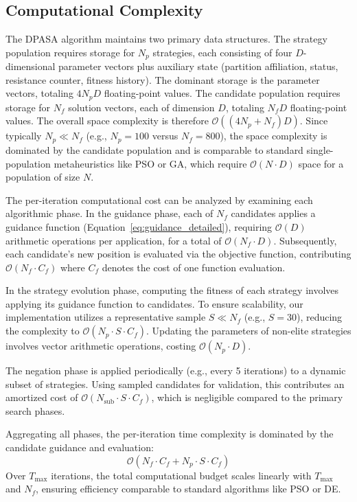 \documentclass[11pt]{article}
\begin{document}
\subsection{Computational Complexity}
\label{sec:method_complexity}

The DPASA algorithm maintains two primary data structures. The strategy population requires storage for $N_p$ strategies, each consisting of four $D$-dimensional parameter vectors plus auxiliary state (partition affiliation, status, resistance counter, fitness history). The dominant storage is the parameter vectors, totaling $4N_p D$ floating-point values. The candidate population requires storage for $N_f$ solution vectors, each of dimension $D$, totaling $N_f D$ floating-point values. The overall space complexity is therefore $\mathcal{O}((4N_p + N_f)D)$. Since typically $N_p \ll N_f$ (e.g., $N_p = 100$ versus $N_f = 800$), the space complexity is dominated by the candidate population and is comparable to standard single-population metaheuristics like PSO or GA, which require $\mathcal{O}(N \cdot D)$ space for a population of size $N$.

The per-iteration computational cost can be analyzed by examining each algorithmic phase. In the guidance phase, each of $N_f$ candidates applies a guidance function (Equation~\ref{eq:guidance_detailed}), requiring $\mathcal{O}(D)$ arithmetic operations per application, for a total of $\mathcal{O}(N_f \cdot D)$. Subsequently, each candidate's new position is evaluated via the objective function, contributing $\mathcal{O}(N_f \cdot C_f)$ where $C_f$ denotes the cost of one function evaluation.

In the strategy evolution phase, computing the fitness of each strategy involves applying its guidance function to candidates. To ensure scalability, our implementation utilizes a representative sample $S \ll N_f$ (e.g., $S=30$), reducing the complexity to $\mathcal{O}(N_p \cdot S \cdot C_f)$. Updating the parameters of non-elite strategies involves vector arithmetic operations, costing $\mathcal{O}(N_p \cdot D)$.

The negation phase is applied periodically (e.g., every 5 iterations) to a dynamic subset of strategies. Using sampled candidates for validation, this contributes an amortized cost of $\mathcal{O}(N_{\text{sub}} \cdot S \cdot C_f)$, which is negligible compared to the primary search phases.

Aggregating all phases, the per-iteration time complexity is dominated by the candidate guidance and evaluation:
\begin{equation}
\mathcal{O}(N_f \cdot C_f + N_p \cdot S \cdot C_f)
\end{equation}
Over $T_{\max}$ iterations, the total computational budget scales linearly with $T_{\max}$ and $N_f$, ensuring efficiency comparable to standard algorithms like PSO or DE.
\end{document}
